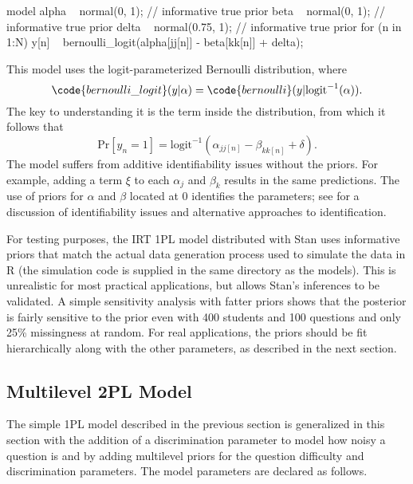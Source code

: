 \begin{stancode}
model {
  alpha ~ normal(0, 1);         // informative true prior
  beta ~ normal(0, 1);          // informative true prior
  delta ~ normal(0.75, 1);      // informative true prior
  for (n in 1:N)
    y[n] ~ bernoulli_logit(alpha[jj[n]] - beta[kk[n]] + delta);
}
\end{stancode}
%
This model uses the logit-parameterized Bernoulli distribution, where
\[
\code{bernoulli\_logit}(y|\alpha) =
\code{bernoulli}(y|\mbox{logit}^{-1}(\alpha)).
\]
%
The key to understanding it is the term inside the
 distribution, from which it follows that
\[
\mbox{Pr}[y_n = 1] = \mbox{logit}^{-1}(\alpha_{jj[n]} - \beta_{kk[n]}
+ \delta).
\]
%
The model suffers from additive identifiability issues without the
priors.  For example, adding a term $\xi$ to each $\alpha_j$ and
$\beta_k$ results in the same predictions.  The use of priors for
$\alpha$ and $\beta$ located at 0 identifies the parameters; see
\citep{GelmanHill:2007} for a discussion of identifiability issues and
alternative approaches to identification.  

For testing purposes, the IRT 1PL model distributed with Stan uses
informative priors that match the actual data generation process used
to simulate the data in R (the simulation code is supplied in the same
directory as the models).  This is unrealistic for most practical
applications, but allows Stan's inferences to be validated.  A simple
sensitivity analysis with fatter priors shows that the posterior is
fairly sensitive to the prior even with 400 students and 100 questions
and only 25\% missingness at random.  For real applications, the
priors should be fit hierarchically along with the other parameters,
as described in the next section.


\subsection{Multilevel 2PL Model}

The simple 1PL model described in the previous section is generalized
in this section with the addition of a discrimination parameter to
model how noisy a question is and by adding multilevel priors for the
question difficulty and discrimination parameters.  The model
parameters are declared as follows.
%

